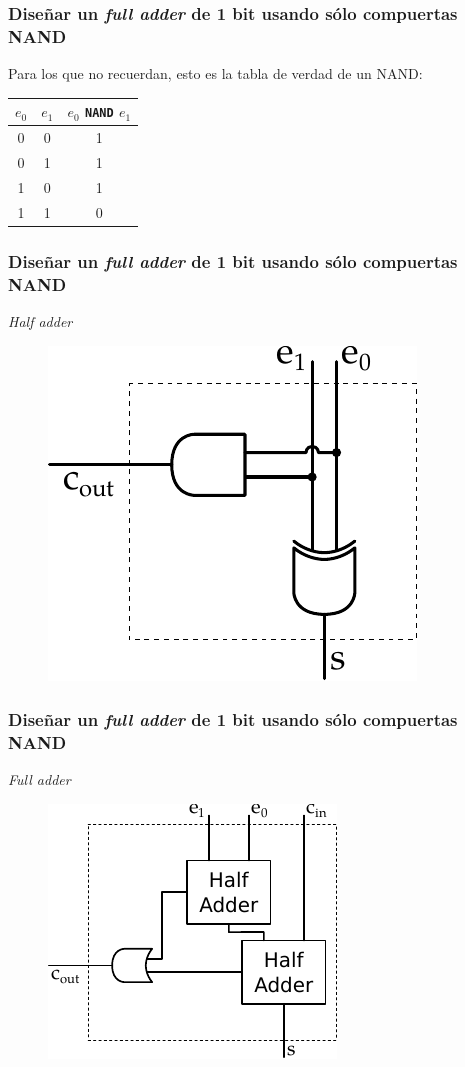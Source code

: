 \documentclass[mathserif,hyperref]{beamer}
\begin{document}
\begin{frame}
\frametitle{\small Diseñar un \textit{full adder} de 1 bit usando sólo
compuertas NAND}
Para los que no recuerdan, esto es la tabla de verdad de un NAND:
\begin{center}\begin{tabular}{| c | c || c |}
  \hline
  $e_0$ & $e_1$ & $e_0$ \texttt{NAND} $e_1$ \\ \hline
    0   &   0   &             1             \\
    0   &   1   &             1             \\
    1   &   0   &             1             \\
    1   &   1   &             0             \\
  \hline
\end{tabular}\end{center}
\end{frame}


\begin{frame}
\frametitle{\small Diseñar un \textit{full adder} de 1 bit usando sólo
compuertas NAND}
\textit{Half adder}
\begin{figure}[htp]
  \includegraphics[scale=0.9]{halfadder.pdf}
\end{figure}
\end{frame}


\begin{frame}
\frametitle{\small Diseñar un \textit{full adder} de 1 bit usando sólo
compuertas NAND}
\textit{Full adder}
\begin{figure}[htp]
  \includegraphics[scale=0.6]{fulladder.pdf}
\end{figure}
\end{frame}
\end{document}
